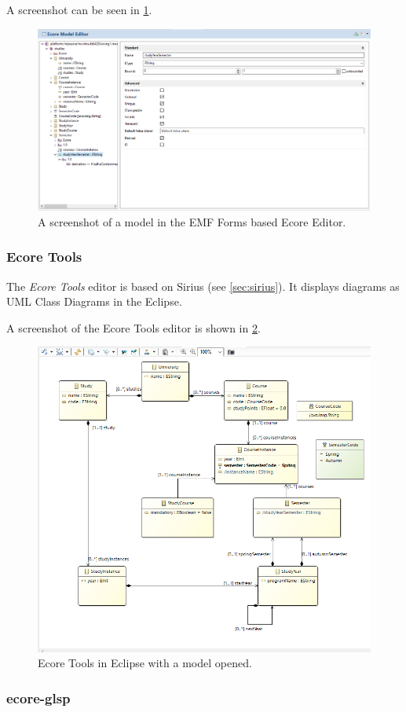 A screenshot can be seen in \cref{fig:emf-forms-ecore-editor}.

\begin{figure}[htbp]  %
  \centering
  \includegraphics[width=\textwidth]{figures/ecore-eclipse-emf-forms-model-editor.png}
  \caption[EMF Forms Ecore Editor]{A screenshot of a model in the EMF Forms based Ecore Editor.}\label{fig:emf-forms-ecore-editor}
\end{figure}



\subsubsection{Ecore Tools} %
The \emph{Ecore Tools} editor is based on Sirius (see \cref{sec:sirius}).
It displays diagrams as \gls{UML} Class Diagrams in the \gls{Eclipse}.

A screenshot of the Ecore Tools editor is shown in \cref{fig:ecore-tools-screenshot}.

\begin{figure}[htbp]  %
  \centering
  \includegraphics[width=\textwidth]{figures/ecore-eclipse-sirius-aird-graphical-editor.png}
  \caption[Ecore Tools Screenshot]{Ecore Tools in \gls{Eclipse} with a model opened.}\label{fig:ecore-tools-screenshot}
\end{figure}


\subsubsection{ecore-glsp} %

